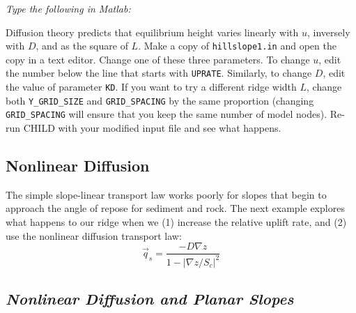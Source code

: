 \documentclass[12pt]{amsart}
\begin{document}
\medskip
{\em
Type the following in Matlab:
Diffusion theory predicts that equilibrium height varies linearly with $u$, inversely with $D$, and as the square of $L$. Make a copy of {\tt hillslope1.in} and open the copy in a text editor. Change one of these three parameters. To change $u$, edit the number below the line that starts with {\tt UPRATE}. Similarly, to change $D$, edit the value of parameter {\tt KD}. If you want to try a different ridge width $L$, change both {\tt Y\_GRID\_SIZE} and {\tt GRID\_SPACING} by the same proportion (changing {\tt GRID\_SPACING} will ensure that you keep the same number of model nodes). Re-run CHILD with your modified input file and see what happens.
}

\subsection{Nonlinear Diffusion}

The simple slope-linear transport law works poorly for slopes that begin to approach the angle of repose for sediment and rock. The next example explores what happens to our ridge when we (1) increase the relative uplift rate, and (2) use the nonlinear diffusion transport law:
\begin{equation}
\vec{q}_s = \frac{-D \nabla z}{1-|\nabla z/S_c|^2}
\end{equation}

\subsection*{\em Nonlinear Diffusion and Planar Slopes}
\end{document}

